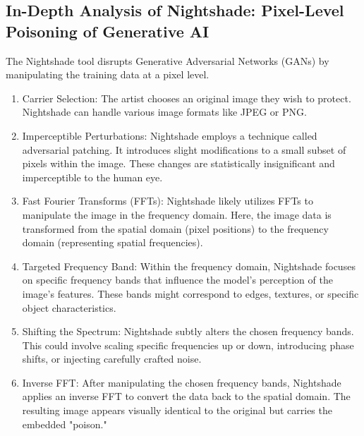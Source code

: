 \documentclass{article}
\begin{document}
\subsection{In-Depth Analysis of Nightshade: Pixel-Level Poisoning of Generative AI}

The Nightshade tool disrupts Generative Adversarial Networks (GANs) by
manipulating the training data at a pixel level.

\begin{enumerate}
      \item Carrier Selection: The artist chooses an original image they wish to protect.
            Nightshade can handle various image formats like JPEG or PNG.

      \item Imperceptible Perturbations: Nightshade employs a technique called adversarial
            patching. It introduces slight modifications to a small subset of pixels within
            the image. These changes are statistically insignificant and imperceptible to
            the human eye.

      \item Fast Fourier Transforms (FFTs): Nightshade likely utilizes FFTs to manipulate
            the image in the frequency domain. Here, the image data is transformed from the
            spatial domain (pixel positions) to the frequency domain (representing spatial
            frequencies).

      \item Targeted Frequency Band: Within the frequency domain, Nightshade focuses on
            specific frequency bands that influence the model's perception of the image's
            features. These bands might correspond to edges, textures, or specific object
            characteristics.

      \item Shifting the Spectrum: Nightshade subtly alters the chosen frequency bands.
            This could involve scaling specific frequencies up or down, introducing phase
            shifts, or injecting carefully crafted noise.

      \item Inverse FFT: After manipulating the chosen frequency bands, Nightshade applies
            an inverse FFT to convert the data back to the spatial domain. The resulting
            image appears visually identical to the original but carries the embedded
            "poison."
\end{enumerate}
\end{document}
